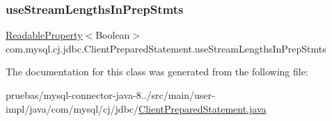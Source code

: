 \subsubsection{\texorpdfstring{use\+Stream\+Lengths\+In\+Prep\+Stmts}{useStreamLengthsInPrepStmts}}
{\footnotesize\ttfamily \mbox{\hyperlink{interfacecom_1_1mysql_1_1cj_1_1conf_1_1_readable_property}{Readable\+Property}}$<$Boolean$>$ com.\+mysql.\+cj.\+jdbc.\+Client\+Prepared\+Statement.\+use\+Stream\+Lengths\+In\+Prep\+Stmts\hspace{0.3cm}{\ttfamily [protected]}}



The documentation for this class was generated from the following file\+:\begin{DoxyCompactItemize}
\item 
pruebas/mysql-\/connector-\/java-\/8../src/main/user-\/impl/java/com/mysql/cj/jdbc/\mbox{\hyperlink{_client_prepared_statement_8java}{Client\+Prepared\+Statement.\+java}}\end{DoxyCompactItemize}
